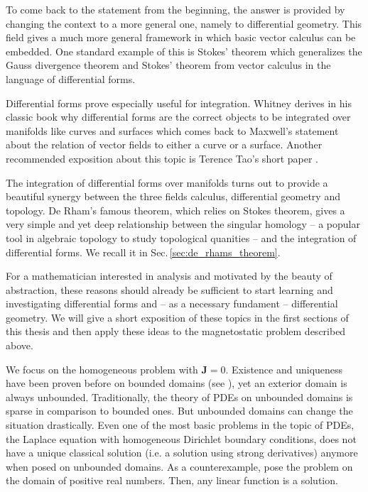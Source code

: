 \documentclass[../master_thesis.tex]{subfiles}
\begin{document}
To come back to the statement from the beginning, the answer is provided 
by changing the context to a more general one, namely to differential geometry. 
This field
gives a much more general framework in which basic vector calculus can 
be embedded. One standard example of this is Stokes' theorem 
which generalizes the Gauss divergence theorem and Stokes' theorem from vector calculus 
in the language of differential forms.

Differential forms prove especially useful for integration. 
Whitney derives in his classic book \cite{whitney} why differential forms are
the correct objects to be integrated over manifolds like curves and surfaces which comes back 
to Maxwell's statement about the relation 
of vector fields to either a curve or a surface. 
Another recommended exposition about this topic is Terence Tao's short paper \cite{terence_tao}. 

The integration of differential forms over manifolds turns out to provide 
a beautiful synergy between the three fields 
calculus, differential geometry and topology. De Rham's famous theorem, which 
relies on Stokes theorem, 
gives a very simple and yet deep relationship between the singular homology -- 
a popular tool in algebraic topology to study topological quanities -- 
and the integration of differential forms. We recall it in Sec.\,\ref{sec:de_rhams_theorem}.

For a mathematician interested in analysis and motivated by the beauty of abstraction, 
these reasons should already be sufficient to start learning and investigating 
differential forms and -- as a necessary fundament -- differential geometry. We will 
give a short exposition of these topics in the first sections of this thesis 
and then apply these ideas to the magnetostatic problem described above.

We focus on the homogeneous problem with $\mathbf{J} = 0$.
Existence and uniqueness have been proven before on bounded domains 
(see \cite[Thm.\,5.4]{mitrea_layer_potentials}),
yet an exterior domain is always unbounded. 
Traditionally, the theory of PDEs on unbounded domains 
is sparse in comparison to bounded ones. But unbounded domains can change the 
situation drastically. Even one of the most basic problems in the topic 
of PDEs, the Laplace equation with homogeneous Dirichlet boundary conditions, does not 
have a unique classical solution (i.e. a solution using strong derivatives) 
anymore when posed on unbounded domains. As a counterexample,
pose the problem on the domain of positive real numbers. Then, any linear function 
is a solution.
\end{document}
